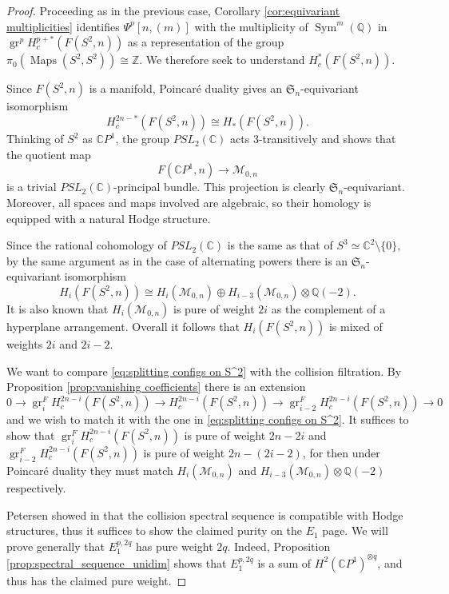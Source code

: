 \documentclass[12pt]{article}
\newcommand{\Z}{\mathbb{Z}}
\newcommand{\Q}{\mathbb{Q}}
\newcommand{\SymGroup}[1][n]{\mathfrak{S}_{#1}}
\newcommand{\EndSpace}[1]{\operatorname{Maps}({#1},{#1})}
\newcommand{\ModuliCurve}[1]{\mathcal{M}_{#1}}
\DeclareMathOperator{\gr}{gr}
\DeclareMathOperator{\Sym}{Sym}
\theoremstyle{plain}
\theoremstyle{definition}
\theoremstyle{remark}
\begin{document}
\begin{proof}
Proceeding as in the previous case, Corollary \ref{cor:equivariant multiplicities} identifies $\Psi^p[n,(m)]$ with the multiplicity of $\Sym^m(\Q)$ in $\gr^p H^{p+*}_c(F(S^2,n))$ as a representation of the group $\pi_0(\EndSpace{S^2})\cong \Z$. We therefore seek to understand $H^*_c(F(S^2,n))$.

Since $F(S^2,n)$ is a manifold, Poincar\'{e} duality gives an $\SymGroup$-equivariant isomorphism
\[
H^{2n-*}_c(F(S^2,n)) \cong H_{*}(F(S^2,n)).
\]
Thinking of $S^2$ as $\mathbb{C}P^1$, the group $PSL_2(\mathbb{C})$ acts 3-transitively and \cite[Theorem 2.1]{FZ00} shows that the quotient map
\[
F(\mathbb{C}P^1,n) \to \ModuliCurve{0,n}
\]
is a trivial $PSL_2(\mathbb{C})$-principal bundle. This projection is clearly $\SymGroup$-equivariant. Moreover, all spaces and maps involved are algebraic, so their homology is equipped with a natural Hodge structure.

Since the rational cohomology of $PSL_2(\mathbb{C})$ is the same as that of $S^3 \simeq \mathbb{C}^2\setminus \{0\}$, by the same argument as in the case of alternating powers there is an $\SymGroup$-equivariant isomorphism
\begin{equation}\label{eq:splitting configs on S^2}
    H_i(F(S^2,n)) \cong H_i(\ModuliCurve{0,n}) \oplus H_{i-3}(\ModuliCurve{0,n})\otimes \Q(-2).
\end{equation}
It is also known that $H_i(\ModuliCurve{0,n})$ is pure of weight $2i$ as the complement of a hyperplane arrangement. Overall it follows that $H_i(F(S^2,n))$ is mixed of weights $2i$ and $2i-2$.

We want to compare \eqref{eq:splitting configs on S^2} with the collision filtration. By Proposition \ref{prop:vanishing coefficients} there is an extension
\begin{equation}
    0 \to \gr_i^F H^{2n-i}_c(F(S^2,n)) \to H^{2n-i}_c(F(S^2,n)) \to \gr_{i-2}^F H^{2n-i}_c(F(S^2,n)) \to 0
\end{equation}
and we wish to match it with the one in \eqref{eq:splitting configs on S^2}. It suffices to show that $\gr_i^F H^{2n-i}_c(F(S^2,n))$ is pure of weight $2n-2i$ and $\gr_{i-2}^F H^{2n-i}_c(F(S^2,n))$ is pure of weight $2n-(2i-2)$, for then under Poincar\'{e} duality they must match $H_i(\ModuliCurve{0,n})$ and $H_{i-3}(\ModuliCurve{0,n})\otimes \Q(-2)$ respectively.

Petersen showed in \cite[\S3.2]{Pet17} that the collision spectral sequence is compatible with Hodge structures, thus it suffices to show the claimed purity on the $E_1$ page. We will prove generally that $E_1^{p,2q}$ has pure weight $2q$. Indeed, Proposition \ref{prop:spectral_sequence_unidim} shows that $E_1^{p,2q}$ is a sum of $H^2(\mathbb{C}P^1)^{\otimes q}$, and thus has the claimed pure weight.


\end{proof}
\end{document}
